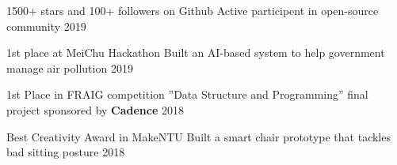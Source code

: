 \cvsubsection{}

\begin{cvhonors}


  \cvhonor
    {1500+ stars and 100+ followers on Github} %
    {Active participent in open-source community} %
    {} %
    {2019} %

  \cvhonor
    {1st place at MeiChu Hackathon} %
    {Built an AI-based system to help government manage air pollution} %
    {} %
    {2019} %

  \cvhonor
    {1st Place in FRAIG competition} %
    {”Data Structure and Programming” final project sponsored by \textbf{Cadence}} %
    {} %
    {2018} %

  \cvhonor
    {Best Creativity Award in MakeNTU} %
    {Built a smart chair prototype that tackles bad sitting posture} %
    {} %
    {2018} %

\end{cvhonors}
